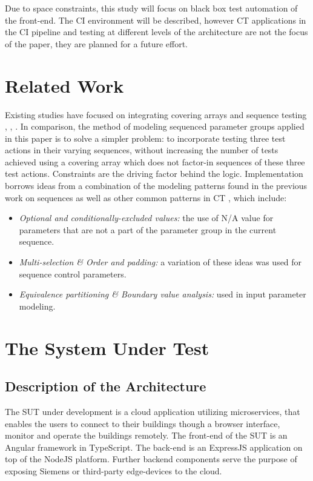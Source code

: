 \documentclass[conference]{IEEEtran}
\begin{document}
Due to space constraints, this study will focus on black box test automation of the front-end.
The CI environment will be described, however CT applications in the CI pipeline and testing at different levels of the architecture are not the focus of the paper, they are planned for a future effort.

\section{Related Work}

	Existing studies have focused on integrating covering arrays and sequence testing \cite{kuhn2012combinatorial}, \cite{farchi2014combinatorial}, \cite{brain2012event}.
	In comparison, the method of modeling sequenced parameter groups applied in this paper is to solve a simpler problem:
	to incorporate testing three test actions in their varying sequences, without increasing the number of tests achieved using a covering array which does not factor-in sequences of these three test actions.
	Constraints are the driving factor behind the logic. Implementation borrows ideas from a combination of the modeling patterns found in the previous work on sequences as well as other common patterns in CT \cite{segall2012common}, which include: 
	\begin{itemize}
		\item \textit{Optional and conditionally-excluded values:} the use of N/A value for parameters that are not a part of the parameter group in the current sequence.
		\item	\textit{Multi-selection \& Order and padding:} a variation of these ideas was used for sequence control parameters.
		\item \textit{Equivalence partitioning \& Boundary value analysis:} used in input parameter modeling.
	\end{itemize}

\section{The System Under Test}
	\subsection{Description of the Architecture}
	
	The SUT under development is a cloud application utilizing microservices, that enables the users to connect to their buildings though a browser interface, monitor and operate the buildings remotely.
	The front-end of the SUT is an Angular framework in TypeScript.
	The back-end is an ExpressJS application on top of the NodeJS platform. 
	Further backend components serve the purpose of exposing Siemens or third-party edge-devices to the cloud.
\end{document}
